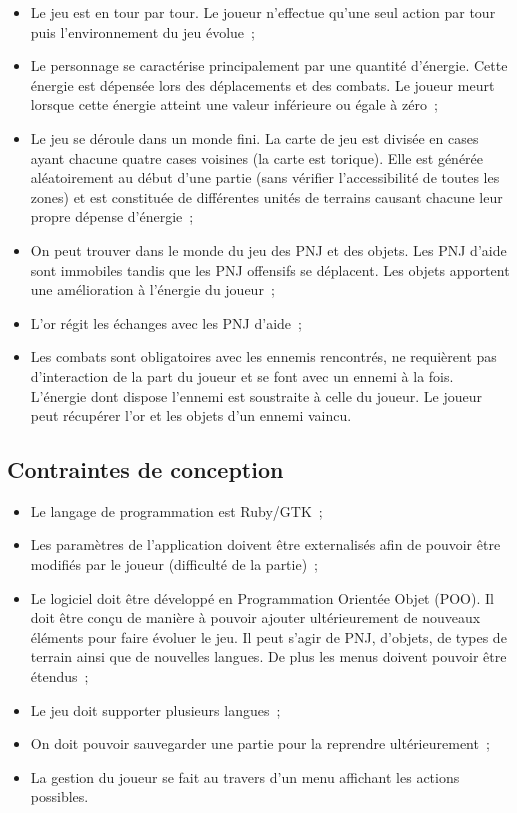 \documentclass[11pt]{article}
\begin{document}
\begin{itemize}
   \item Le jeu est en tour par tour. Le joueur n'effectue qu'une seul action par tour puis l’environnement du jeu évolue~;
   \item Le personnage se caractérise principalement par une quantité d'énergie. Cette énergie est dépensée lors des déplacements et des combats. Le joueur meurt lorsque cette énergie atteint une valeur inférieure ou égale à zéro~;
   \item Le jeu se déroule dans un monde fini. La carte de jeu est divisée en cases ayant chacune quatre cases voisines (la carte est torique). Elle est générée aléatoirement au début d'une partie (sans vérifier l’accessibilité de toutes les zones) et est constituée de différentes unités de terrains causant chacune leur propre dépense d'énergie~;
   \item On peut trouver dans le monde du jeu des PNJ et des objets. Les PNJ d'aide sont immobiles tandis que les PNJ offensifs se déplacent. Les objets apportent une amélioration à l'énergie du joueur~;
   \item L'or régit les échanges avec les PNJ d'aide~;
   \item Les combats sont obligatoires avec les ennemis rencontrés, ne requièrent pas d'interaction de la part du joueur et se font avec un ennemi à la fois. L'énergie dont dispose l'ennemi est soustraite à celle du joueur. Le joueur peut récupérer l'or et les objets d'un ennemi vaincu.
\end{itemize}




\subsection{Contraintes de conception}


\begin{itemize}
   \item Le langage de programmation est Ruby/GTK~;
   \item Les paramètres de l’application doivent être externalisés afin de pouvoir être modifiés par le joueur (difficulté de la partie)~;
   \item Le logiciel doit être développé en Programmation Orientée Objet (POO). Il doit être conçu de manière à pouvoir ajouter ultérieurement de nouveaux éléments pour faire évoluer le jeu. Il peut s'agir de PNJ, d'objets, de types de terrain ainsi que de nouvelles langues. De plus les menus doivent pouvoir être étendus~;
   \item Le jeu doit supporter plusieurs langues~;
   \item On doit pouvoir sauvegarder une partie pour la reprendre ultérieurement~;
   \item La gestion du joueur se fait au travers d'un menu affichant les actions possibles.
\end{itemize}
\end{document}
